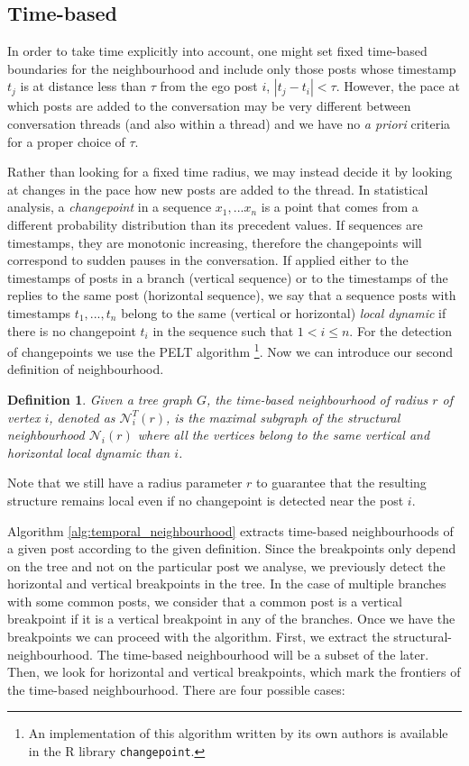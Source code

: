 \documentclass[conference]{IEEEtran}
\newtheorem{definition}{Definition}
\begin{document}
\subsection{Time-based}
In order to take time explicitly into account, one might set fixed time-based boundaries for the neighbourhood and include only those posts whose timestamp $t_j$ is at distance less than $\tau$ from the ego post $i$, $|t_j-t_i|<\tau$. However, the pace at which posts are added to the conversation may be very different between conversation threads (and also within a thread) and we have no \textit{a priori} criteria for a proper choice of $\tau$. 

Rather than looking for a fixed time radius, we may instead decide it by looking at changes in the pace how new posts are added to the thread. In statistical analysis, a \textit{changepoint} in a sequence $x_1,...x_n$ is a point that comes from a different probability distribution than its precedent values. If sequences are timestamps, they are monotonic increasing, therefore the changepoints will correspond to sudden pauses in the conversation. If applied either to the timestamps of posts in a branch (vertical sequence) or to the timestamps of the replies to the same post (horizontal sequence), we say that a sequence posts with timestamps $t_1,...,t_n$ belong to the same (vertical or horizontal) \textit{local dynamic} if there is no changepoint $t_i$ in the sequence such that $1 < i \leq n$. For the detection of changepoints we use the PELT algorithm \cite{Killick2012}\footnote{An implementation of this algorithm written by its own authors is available in the R library \texttt{changepoint}.}. Now we can introduce our second definition of neighbourhood.
\begin{definition}
Given a tree graph $G$, the \textit{time-based neighbourhood} of radius $r$ of vertex $i$, denoted as $\mathcal{N}_{i}^T(r)$, is the maximal subgraph of the structural neighbourhood $\mathcal{N}_i(r)$ where all the vertices  belong to the same vertical and horizontal local dynamic than $i$.
\end{definition}
Note that we still have a radius parameter $r$ to guarantee that the resulting structure remains local even if no changepoint is detected near the post $i$. 

Algorithm \ref{alg:temporal_neighbourhood} extracts time-based neighbourhoods of a given post according to the given definition. Since the breakpoints only depend on the tree and not on the particular post we analyse, we previously detect the horizontal and vertical breakpoints in the tree. In the case of multiple branches with some common posts, we consider that a common post is a vertical breakpoint if it is a vertical breakpoint in any of the branches. Once we have the breakpoints we can proceed with the algorithm. First, we extract the structural-neighbourhood. The time-based neighbourhood will be a subset of the later. Then, we look for horizontal and vertical breakpoints, which mark the frontiers of the time-based neighbourhood. There are four possible cases:
\end{document}
